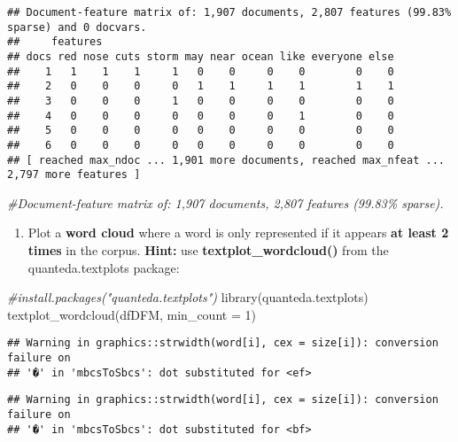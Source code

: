 \documentclass[
]{article}
\newenvironment{Shaded}{\begin{snugshade}}{\end{snugshade}}
\newcommand{\AttributeTok}[1]{\textcolor[rgb]{0.77,0.63,0.00}{#1}}
\newcommand{\CommentTok}[1]{\textcolor[rgb]{0.56,0.35,0.01}{\textit{#1}}}
\newcommand{\DecValTok}[1]{\textcolor[rgb]{0.00,0.00,0.81}{#1}}
\newcommand{\FunctionTok}[1]{\textcolor[rgb]{0.00,0.00,0.00}{#1}}
\newcommand{\NormalTok}[1]{#1}
\providecommand{\tightlist}{%
  \setlength{\itemsep}{0pt}\setlength{\parskip}{0pt}}
\begin{document}
\begin{verbatim}
## Document-feature matrix of: 1,907 documents, 2,807 features (99.83% sparse) and 0 docvars.
##     features
## docs red nose cuts storm may near ocean like everyone else
##    1   1    1    1     1   0    0     0    0        0    0
##    2   0    0    0     0   1    1     1    1        1    1
##    3   0    0    0     1   0    0     0    0        0    0
##    4   0    0    0     0   0    0     0    1        0    0
##    5   0    0    0     0   0    0     0    0        0    0
##    6   0    0    0     0   0    0     0    0        0    0
## [ reached max_ndoc ... 1,901 more documents, reached max_nfeat ... 2,797 more features ]
\end{verbatim}

\begin{Shaded}
\begin{Highlighting}[]
\CommentTok{\#Document{-}feature matrix of: 1,907 documents, 2,807 features (99.83\% sparse).}
\end{Highlighting}
\end{Shaded}

\begin{enumerate}
\def\labelenumi{\Alph{enumi}.}
\setcounter{enumi}{4}
\tightlist
\item
  Plot a \textbf{word cloud} where a word is only represented if it
  appears \textbf{at least 2 times} in the corpus. \textbf{Hint:} use
  \textbf{textplot\_wordcloud()} from the quanteda.textplots package:
\end{enumerate}

\begin{Shaded}
\begin{Highlighting}[]
\CommentTok{\#install.packages("quanteda.textplots")}
\FunctionTok{library}\NormalTok{(quanteda.textplots)}
\FunctionTok{textplot\_wordcloud}\NormalTok{(dfDFM, }\AttributeTok{min\_count =} \DecValTok{1}\NormalTok{)}
\end{Highlighting}
\end{Shaded}

\begin{verbatim}
## Warning in graphics::strwidth(word[i], cex = size[i]): conversion failure on
## '�' in 'mbcsToSbcs': dot substituted for <ef>
\end{verbatim}

\begin{verbatim}
## Warning in graphics::strwidth(word[i], cex = size[i]): conversion failure on
## '�' in 'mbcsToSbcs': dot substituted for <bf>
\end{verbatim}
\end{document}
